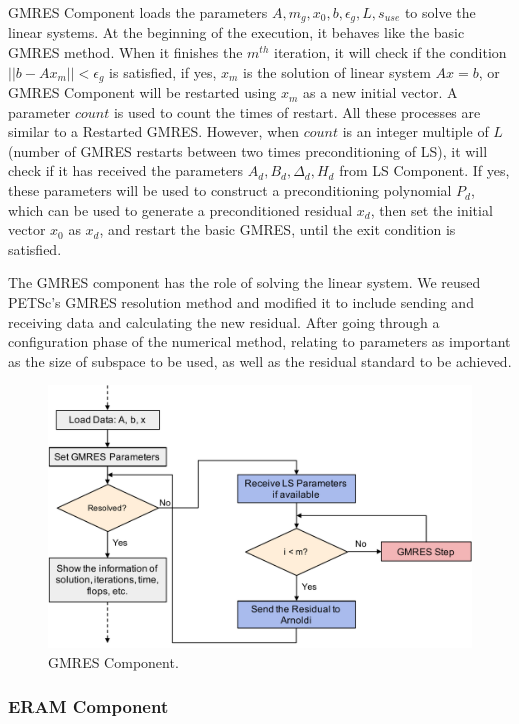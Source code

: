 GMRES Component loads the parameters $A, m_g, x_0, b, \epsilon_g, L, s_{use}$ to solve the linear systems. At the beginning of the execution, it behaves like the basic GMRES method. When it finishes the $m^{th}$ iteration, it will check if the condition $||b-Ax_m||<\epsilon_g$ is satisfied, if yes, $x_m$ is the solution of linear system $Ax=b$, or GMRES Component will be restarted using $x_m$ as a new initial vector. A parameter $count$ is used to count the times of restart. All these processes are similar to a Restarted GMRES. However, when $count$ is an integer multiple of $L$ (number of GMRES restarts between two times preconditioning of LS), it will check if it has received the parameters $A_d, B_d, \Delta_d, H_d$ from LS Component. If yes, these parameters will be used to construct a preconditioning polynomial $P_d$, which can be used to generate a preconditioned residual $x_d$, then set the initial vector $x_0$ as $x_d$, and restart the basic GMRES, until the exit condition is satisfied.

The GMRES component has the role of solving the linear system.  We reused PETSc's GMRES resolution method and modified it to include sending and receiving data and calculating the new residual. After going through a configuration phase of the numerical method, relating to parameters as important as the size of subspace to be used, as well as the residual standard to be achieved.

\begin{figure}[htbp]
	\centering
	\includegraphics[width=6.2in]{fig/GMRES-component.pdf}
	\caption{GMRES Component.}
	\label{gmres-component}
\end{figure}

\subsubsection{ERAM Component}

